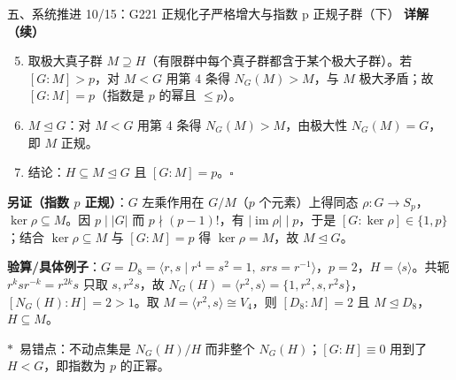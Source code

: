 \documentclass[aspectratio=169,10pt,fontset=none]{ctexbeamer}
\newcommand{\key}[1]{\textcolor{ink}{\bfseries #1}}
\newcommand{\starpt}{\textcolor{accent}{\bfseries$\ast$}}
\begin{document}
\begin{frame}[t]{五、系统推进 10/15：G221 正规化子严格增大与指数 p 正规子群（下）}
\scriptsize
\key{详解（续）}
\begin{enumerate}
  \setcounter{enumi}{4}
  \item 取极大真子群 $M\supseteq H$（有限群中每个真子群都含于某个极大子群）。若 $[G:M]>p$，对 $M<G$ 用第 4 条得 $N_G(M)>M$，与 $M$ 极大矛盾；故 $[G:M]=p$（指数是 $p$ 的幂且 $\le p$）。
  \item $M\trianglelefteq G$：对 $M<G$ 用第 4 条得 $N_G(M)>M$，由极大性 $N_G(M)=G$，即 $M$ 正规。
  \item 结论：$H\subseteq M\trianglelefteq G$ 且 $[G:M]=p$。$\square$
\end{enumerate}
\key{另证（指数 $p$ 正规）}：$G$ 左乘作用在 $G/M$（$p$ 个元素）上得同态 $\rho:G\to S_p$，$\ker\rho\subseteq M$。因 $p\mid|G|$ 而 $p\nmid(p-1)!$，有 $|\operatorname{im}\rho|\mid p$，于是 $[G:\ker\rho]\in\{1,p\}$；结合 $\ker\rho\subseteq M$ 与 $[G:M]=p$ 得 $\ker\rho=M$，故 $M\trianglelefteq G$。

\key{验算/具体例子}：$G=D_8=\langle r,s\mid r^4=s^2=1,\ srs=r^{-1}\rangle$，$p=2$，$H=\langle s\rangle$。共轭 $r^ksr^{-k}=r^{2k}s$ 只取 $s,r^2s$，故 $N_G(H)=\langle r^2,s\rangle=\{1,r^2,s,r^2s\}$，$[N_G(H):H]=2>1$。取 $M=\langle r^2,s\rangle\cong V_4$，则 $[D_8:M]=2$ 且 $M\trianglelefteq D_8$，$H\subseteq M$。

\starpt~易错点：不动点集是 $N_G(H)/H$ 而非整个 $N_G(H)$；$[G:H]\equiv0$ 用到了 $H<G$，即指数为 $p$ 的正幂。
\end{frame}
\end{document}
